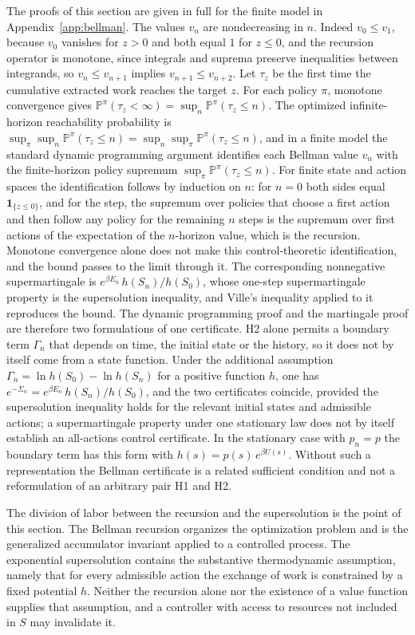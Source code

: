 \documentclass[11pt]{article}
\theoremstyle{definition}
\theoremstyle{remark}
\renewcommand{\Pr}{\mathbb{P}}
\begin{document}
The proofs of this section are given in full for the finite model in Appendix~\ref{app:bellman}. The values $v_n$ are nondecreasing in $n$. Indeed $v_0 \le v_1$, because $v_0$ vanishes for $z > 0$ and both equal $1$ for $z \le 0$, and the recursion operator is monotone, since integrals and suprema preserve inequalities between integrands, so $v_n \le v_{n+1}$ implies $v_{n+1} \le v_{n+2}$. Let $\tau_z$ be the first time the cumulative extracted work reaches the target $z$. For each policy $\pi$, monotone convergence gives $\Pr^{\pi}(\tau_z < \infty) = \sup_n \Pr^{\pi}(\tau_z \le n)$. The optimized infinite-horizon reachability probability is $\sup_\pi \sup_n \Pr^{\pi}(\tau_z \le n) = \sup_n \sup_\pi \Pr^{\pi}(\tau_z \le n)$, and in a finite model the standard dynamic programming argument identifies each Bellman value $v_n$ with the finite-horizon policy supremum $\sup_\pi \Pr^{\pi}(\tau_z \le n)$. For finite state and action spaces the identification follows by induction on $n$: for $n = 0$ both sides equal $\mathbf 1_{\{z \le 0\}}$, and for the step, the supremum over policies that choose a first action and then follow any policy for the remaining $n$ steps is the supremum over first actions of the expectation of the $n$-horizon value, which is the recursion. Monotone convergence alone does not make this control-theoretic identification, and the bound passes to the limit through it. The corresponding nonnegative supermartingale is $e^{\beta E_n}\, h(S_n)/h(S_0)$, whose one-step supermartingale property is the supersolution inequality, and Ville's inequality applied to it reproduces the bound. The dynamic programming proof and the martingale proof are therefore two formulations of one certificate. H2 alone permits a boundary term $\Gamma_n$ that depends on time, the initial state or the history, so it does not by itself come from a state function. Under the additional assumption $\Gamma_n = \ln h(S_0) - \ln h(S_n)$ for a positive function $h$, one has $e^{-\Sigma_n} = e^{\beta E_n}\, h(S_n)/h(S_0)$, and the two certificates coincide, provided the supersolution inequality holds for the relevant initial states and admissible actions; a supermartingale property under one stationary law does not by itself establish an all-actions control certificate. In the stationary case with $p_n = p$ the boundary term has this form with $h(s) = p(s)\,e^{\beta U(s)}$. Without such a representation the Bellman certificate is a related sufficient condition and not a reformulation of an arbitrary pair H1 and H2.

The division of labor between the recursion and the supersolution is the point of this section. The Bellman recursion organizes the optimization problem and is the generalized accumulator invariant applied to a controlled process. The exponential supersolution contains the substantive thermodynamic assumption, namely that for every admissible action the exchange of work is constrained by a fixed potential $h$. Neither the recursion alone nor the existence of a value function supplies that assumption, and a controller with access to resources not included in $S$ may invalidate it.
\end{document}

